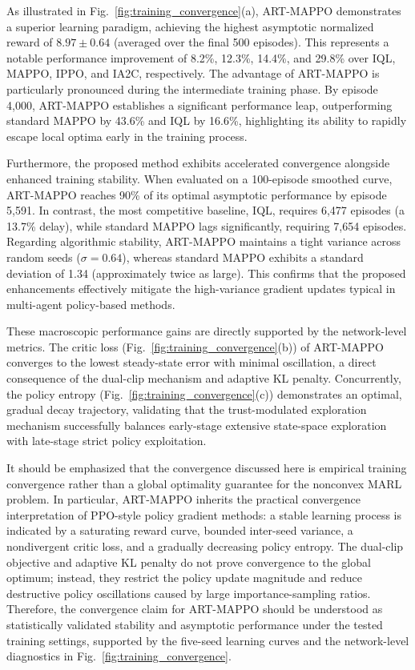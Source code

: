 \documentclass[lettersize,journal]{IEEEtran}
\providecommand{\DIFadd}[1]{{\protect\color{blue}#1}} %
\providecommand{\DIFaddbegin}{} %
\newcommand{\DIFaddincludegraphics}[2][]{{\color{blue}\fbox{\DIFOincludegraphics[#1]{#2}}}} %
\DeclareRobustCommand{\DIFaddbegin}{\DIFOaddbegin \let\includegraphics\DIFaddincludegraphics} %
\begin{document}
As illustrated in Fig.~\ref{fig:training_convergence}(a), ART-MAPPO demonstrates a superior learning paradigm, achieving the highest asymptotic normalized reward of $8.97 \pm 0.64$ (averaged over the final 500 episodes). This represents a notable performance improvement of 8.2\%, 12.3\%, 14.4\%, and 29.8\% over IQL, MAPPO, IPPO, and IA2C, respectively. The advantage of ART-MAPPO is particularly pronounced during the intermediate training phase. By episode 4,000, ART-MAPPO establishes a significant performance leap, outperforming standard MAPPO by 43.6\% and IQL by 16.6\%, highlighting its ability to rapidly escape local optima early in the training process.

Furthermore, the proposed method exhibits accelerated convergence alongside enhanced training stability. When evaluated on a 100-episode smoothed curve, ART-MAPPO reaches 90\% of its optimal asymptotic performance by episode 5,591. In contrast, the most competitive baseline, IQL, requires 6,477 episodes (a 13.7\% delay), while standard MAPPO lags significantly, requiring 7,654 episodes. Regarding algorithmic stability, ART-MAPPO maintains a tight variance across random seeds ($\sigma = 0.64$), whereas standard MAPPO exhibits a standard deviation of 1.34 (approximately twice as large). This confirms that the proposed enhancements effectively mitigate the high-variance gradient updates typical in multi-agent policy-based methods.

These macroscopic performance gains are directly supported by the network-level metrics. The critic loss (Fig.~\ref{fig:training_convergence}(b)) of ART-MAPPO converges to the lowest steady-state error with minimal oscillation, a direct consequence of the dual-clip mechanism and adaptive KL penalty. Concurrently, the policy entropy (Fig.~\ref{fig:training_convergence}(c)) demonstrates an optimal, gradual decay trajectory, validating that the trust-modulated exploration mechanism successfully balances early-stage extensive state-space exploration with late-stage strict policy exploitation.

\DIFaddbegin \DIFadd{It should be emphasized that the convergence discussed here is empirical training
convergence rather than a global optimality guarantee for the nonconvex MARL problem. In
particular, ART-MAPPO inherits the practical convergence interpretation of PPO-style policy
gradient methods: a stable learning process is indicated by a saturating reward curve, bounded
inter-seed variance, a nondivergent critic loss, and a gradually decreasing policy entropy.
The dual-clip objective and adaptive KL penalty do not prove convergence to the global
optimum; instead, they restrict the policy update magnitude and reduce destructive policy
oscillations caused by large importance-sampling ratios. Therefore, the convergence claim for
ART-MAPPO should be understood as statistically validated stability and asymptotic performance
under the tested training settings, supported by the five-seed learning curves and the
network-level diagnostics in Fig.~\ref{fig:training_convergence}.
}
\end{document}
